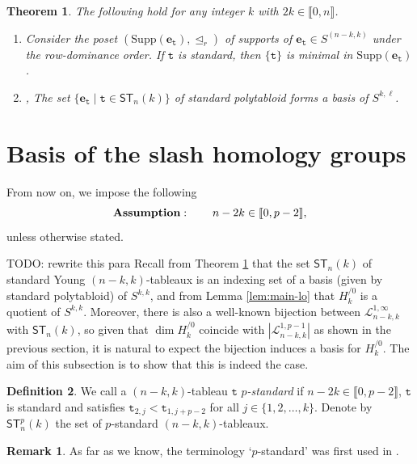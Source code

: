 \documentclass[a4paper]{amsart}
\numberwithin{equation}{subsection}
\newtheorem{theorem}{Theorem}[section]
\theoremstyle{definition}
\newtheorem{remark}{Remark}
\newtheorem{definition}[theorem]{Definition}
\newcommand{\interval}[1]{\llbracket #1 \rrbracket}
\newcommand{\comm}[1]{{\color{red}#1}}
\newcommand{\bfe}{\pmb{e}}
\newcommand{\tbx}{\mathtt{t}}
\newcommand{\ulhd}{\trianglelefteq}
\newcommand{\ST}{\mathsf{ST}}
\numberwithin{equation}{subsection}
\begin{document}
\begin{theorem}\label{thm:Spechtbasis}
The following hold for any integer $k$ with $2k\in\interval{0,n}$.
\begin{enumerate}[(1)]
\item {\rm\cite[7.4]{James2}} Consider the poset $(\mathrm{Supp}(\bfe_{\tbx}), \ulhd_r)$ of supports of $\bfe_{\tbx}\in S^{(n-k,k)}$ under the row-dominance order.  If $\tbx$ is standard, then $\{\tbx\}$ is minimal in $\mathrm{Supp}(\bfe_{\tbx})$.

\item {\rm \cite{Pe},\cite[9.4]{James2}} The set $\{ \bfe_{\tbx}\mid \tbx\in \ST_n(k)\}$ of standard polytabloid forms a basis of $S^{k,\ell}$.
\end{enumerate}
\end{theorem}



\section{Basis of the slash homology groups}\label{sec:basis}

From now on, we impose the following
\[
\text{\bf Assumption}: \qquad n-2k \in \interval{0,p-2},
\]
unless otherwise stated.

\comm{TODO: rewrite this para}
Recall from Theorem \ref{thm:Spechtbasis} that the set $\ST_n(k)$ of standard Young $(n-k,k)$-tableaux is an indexing set of a basis (given by standard polytabloid) of $S^{k,k}$, and from Lemma \ref{lem:main-lo} that $H_k^{/0}$ is a quotient of $S^{k,k}$.
Moreover, there is also a well-known bijection between $\mathcal{L}_{n-k,k}^{1,\infty}$ with $\ST_n(k)$, so given that $\dim H_k^{/0}$ coincide with $|\mathcal{L}_{n-k,k}^{1,p-1}|$ as shown in the previous section, it is natural to expect the bijection induces a basis for $H_k^{/0}$.
The aim of this subsection is to show that this is indeed the case.

\begin{definition}\label{def:p-std}
We call a $(n-k,k)$-tableau $\tbx$ \emph{$p$-standard} if $n-2k\in\interval{0,p-2}$, $\tbx$ is standard and satisfies $\tbx_{2,j}<\tbx_{1,j+p-2}$ for all $j\in\{1, 2, \ldots, k\}$.  Denote by $\ST_n^p(k)$ the set of $p$-standard $(n-k,k)$-tableaux.
\end{definition}
\begin{remark}
As far as we know, the terminology `$p$-standard' was first used in \cite{Kl}.
\end{remark}
\end{document}
